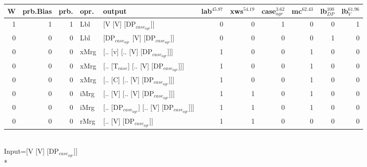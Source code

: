 \begin{tabularx}{\linewidth}{rrrlXrrrrrr}
\hline
   W &   prb.Bias &   prb. & opr.   & output                                    &   lab$^{45.87}$ &   xws$^{54.19}$ &   case$_{agr}^{3.62}$ &   mc$^{62.43}$ &   lb$_{DP}^{100}$ &   lb$_{V}^{61.96}$ \\
\hline
   1 &       1 &   1 & Lbl  & [V [V] [DP$_{case_{agr}}$]]                     &             0 &             0 &                  1 &            0 &                0 &              1 \\
   0 &       0 &   0 & Lbl  & [DP$_{case_{agr}}$ [V] [DP$_{case_{agr}}$]]           &             0 &             0 &                  0 &            0 &                1 &              0 \\
   0 &       0 &   0 & xMrg & [.. [v] [.. [V] [DP$_{case_{agr}}$]]]           &             1 &             0 &                  0 &            1 &                0 &              0 \\
   0 &       0 &   0 & xMrg & [.. [T$_{case}$] [.. [V] [DP$_{case_{agr}}$]]]      &             1 &             0 &                  0 &            1 &                0 &              0 \\
   0 &       0 &   0 & xMrg & [.. [C] [.. [V] [DP$_{case_{agr}}$]]]           &             1 &             0 &                  0 &            1 &                0 &              0 \\
   0 &       0 &   0 & iMrg & [.. [V] [.. [V] [DP$_{case_{agr}}$]]]           &             1 &             1 &                  0 &            1 &                0 &              0 \\
   0 &       0 &   0 & iMrg & [.. [DP$_{case_{agr}}$] [.. [V] [DP$_{case_{agr}}$]]] &             1 &             1 &                  0 &            1 &                0 &              0 \\
   0 &       0 &   0 & rMrg & [.. [V] [DP$_{case_{agr}}$]]                    &             1 &             1 &                  0 &            0 &                0 &              0 \\
\hline
\end{tabularx}\endgroup\\
\begingroup\scriptsize Input=[V [V] [DP$_{case_{agr}}$]]\\*
